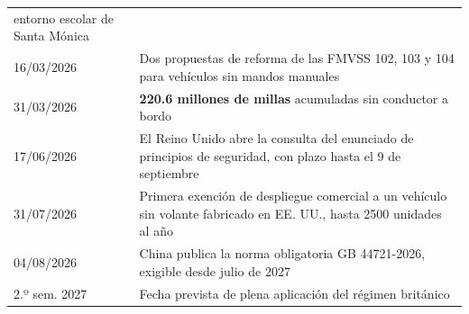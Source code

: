 \documentclass[11pt,letterpaper]{article}
\begin{document}
\begin{table}[tbp]
\begin{tabularx}{\textwidth}{@{}l >{\raggedright\arraybackslash}X@{}}
      entorno escolar de Santa Mónica \parencite{cnbc2026} \\
    16/03/2026 & Dos propuestas de reforma de las FMVSS 102, 103 y 104 para
      vehículos sin mandos manuales \parencite{sidley2026} \\
    31/03/2026 & \textbf{\num{220.6} millones de millas} acumuladas sin conductor
      a bordo \parencite{waymoimpact2026} \\
    17/06/2026 & El Reino Unido abre la consulta del enunciado de principios de
      seguridad, con plazo hasta el 9 de septiembre \parencite{dft2026} \\
    31/07/2026 & Primera exención de despliegue comercial a un vehículo sin
      volante fabricado en EE. UU., hasta \num{2500} unidades al año
      \parencite{fr2026zoox} \\
    04/08/2026 & China publica la norma obligatoria GB 44721-2026, exigible desde
      julio de 2027 \parencite{techtimes2026} \\
    2.º sem. 2027 & Fecha prevista de plena aplicación del régimen británico
      \parencite{dft2026} \\
    \bottomrule
  \end{tabularx}
\end{table}
\end{document}
